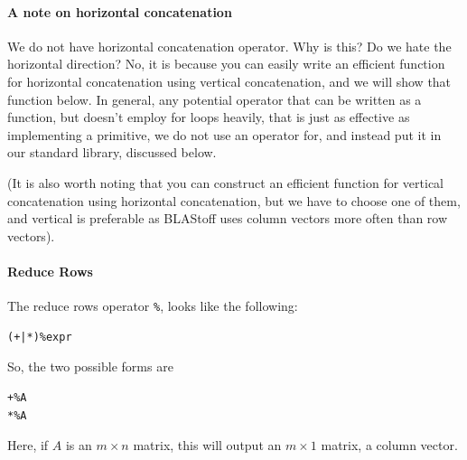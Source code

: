 \paragraph{A note on horizontal concatenation}
\label{sec:2.6.8.1}
We do not have horizontal concatenation operator.  Why is this?  Do we hate the horizontal direction?  No, it is because you can easily write an efficient function for horizontal concatenation using vertical concatenation, and we will show that function below.  In general, any potential operator that can be written as a function, but doesn't employ for loops heavily, that is just as effective as implementing a primitive, we do not use an operator for, and instead put it in our standard library, discussed below.

(It is also worth noting that you can construct an efficient function for vertical concatenation using horizontal concatenation, but we have to choose one of them, and vertical is preferable as BLAStoff uses column vectors more often than row vectors).


\paragraph{Reduce Rows}
The reduce rows operator \verb=%=,  looks like the following:
\begin{lstlisting}
(+|*)%expr
\end{lstlisting}
So, the two possible forms are
\begin{lstlisting}
+%A
*%A
\end{lstlisting}
Here, if $A$ is an $m\times n$ matrix, this will output an $m \times 1$ matrix, a column vector.

